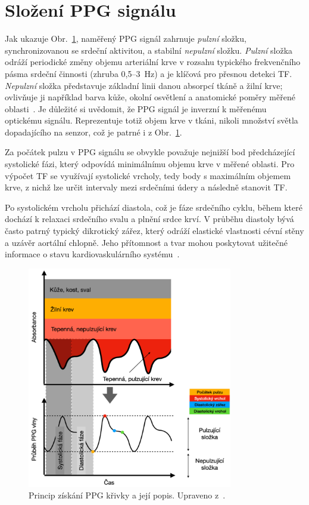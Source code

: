 \section{Složení \acs{PPG} signálu}

Jak ukazuje Obr.~\ref{fig:signalPPG}, naměřený \acs{PPG} signál zahrnuje \textit{pulzní} složku, synchronizovanou se srdeční aktivitou, a stabilní \textit{nepulzní} složku.
\textit{Pulzní} složka odráží periodické změny objemu arteriální krve v rozsahu typického frekvenčního pásma srdeční činnosti (zhruba 0{,}5--3~Hz) a je klíčová pro přesnou detekci \acs{TF}.
\textit{Nepulzní} složka představuje základní linii danou absorpcí tkáně a žilní krve; ovlivňuje ji například barva kůže, okolní osvětlení a anatomické poměry měřené oblasti~\cite{ENIKÖ, Park2022}.
Je důležité si uvědomit, že \acs{PPG} signál je inverzní k měřenému optickému signálu.
Reprezentuje totiž objem krve v tkáni, nikoli množství světla dopadajícího na senzor, což je patrné i z Obr.~\ref{fig:signalPPG}.

Za počátek pulzu v \acs{PPG} signálu se obvykle považuje nejnižší bod předcházející systolické fázi, který odpovídá minimálnímu objemu krve v měřené oblasti.
Pro výpočet \acs{TF} se využívají systolické vrcholy, tedy body s maximálním objemem krve, z nichž lze určit intervaly mezi srdečními údery a následně stanovit \acs{TF}.

Po systolickém vrcholu přichází diastola, což je fáze srdečního cyklu, během které dochází k relaxaci srdečního svalu a plnění srdce krví.
V průběhu diastoly bývá často patrný typický dikrotický zářez, který odráží elastické vlastnosti cévní stěny a uzávěr aortální chlopně.
Jeho přítomnost a tvar mohou poskytovat užitečné informace o stavu kardiovaskulárního systému~\cite{Orphanidou2018, Park2022}.

\begin{figure}[hb]
	\centering
	\includegraphics[width=0.8\textwidth]{./obrazky/signalPPG.png}
	\caption[Fiziologický popis PPG signálu]{Princip získání \acs{PPG} křivky a její popis. Upraveno z~\cite{Park2022}.}
	\label{fig:signalPPG}
\end{figure}